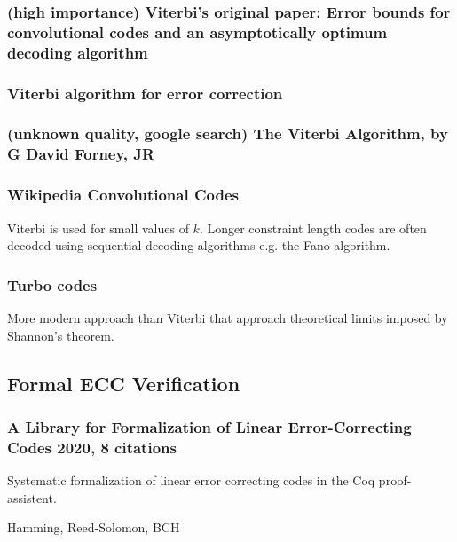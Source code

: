 \documentclass{article}
\begin{document}
\subsubsection{(high importance) Viterbi's original paper: Error bounds for convolutional codes and an asymptotically optimum decoding algorithm }

\subsubsection{Viterbi algorithm for error correction}

\subsubsection{(unknown quality, google search) The Viterbi Algorithm, by G David Forney, JR}

\subsubsection{Wikipedia Convolutional Codes}

Viterbi is used for small values of $k$. Longer constraint length codes are often decoded using sequential decoding algorithms e.g. the Fano algorithm.

\subsubsection{Turbo codes}

More modern approach than Viterbi that approach theoretical limits imposed by Shannon's theorem.


\subsection{Formal ECC Verification}

\subsubsection{A Library for Formalization of Linear Error-Correcting Codes 2020, 8 citations}

Systematic formalization of  linear error correcting codes in the Coq proof-assistent.

Hamming, Reed-Solomon, BCH
\end{document}
